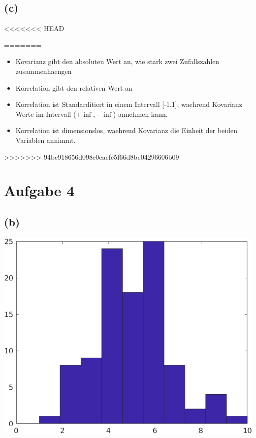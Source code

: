 \documentclass[a4paper]{scrartcl}
\begin{document}
\subsection*{(c)}
<<<<<<< HEAD






=======
\begin{itemize}
	\item Kovarianz gibt den absoluten Wert an, wie stark  zwei Zufallszahlen zusammenhaengen
	\item Korrelation gibt den relativen Wert an
	\item Korrelation ist Standarditiert in einem Intervall [-1,1], waehrend Kovarianz Werte im Intervall ($+\inf, -\inf$) annehmen kann. 
	\item Korrelation ist dimensionslos, waehrend Kovarianz die Einheit der beiden Variablen annimmt.
\end{itemize}
>>>>>>> 94bc918656d098e0cacfe5f66d8bc04296606b09
\section*{Aufgabe 4}

\subsection*{(b)}

\begin{center}
	\includegraphics*[scale = 0.5]{question4b.png}
\end{center}
\end{document}
